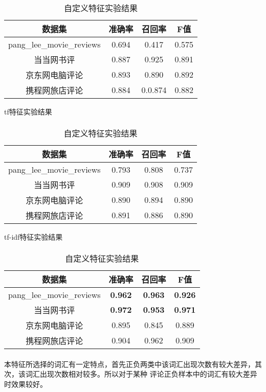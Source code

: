 \documentclass[a4paper,12pt]{article}
\begin{document}
\begin{CJK}{UTF8}{gbsn}
\begin{CJK}{UTF8}{gbsn}
\begin{table}
\paragraph{}
\begin{tabular}{|c|c|c|c|}
\hline
数据集 & 准确率 & 召回率 & F值\\
\hline
pang\_lee\_movie\_reviews & 0.694 & 0.417 & 0.575\\
当当网书评 & 0.887 & 0.925 & 0.891\\
京东网电脑评论 & 0.893 & 0.890 & 0.892\\
携程网旅店评论 & 0.884 & 0.0.874 & 0.882\\
\hline
\end{tabular}
\caption{tf特征实验结果}
\label{table:1}

\paragraph{}
\begin{tabular}{|c|c|c|c|}
\hline
数据集 & 准确率 & 召回率 & F值\\
\hline
pang\_lee\_movie\_reviews & 0.793 & 0.808 & 0.737\\
当当网书评 & 0.909 & 0.908 & 0.909\\
京东网电脑评论 & 0.890 & 0.894 & 0.890\\
携程网旅店评论 & 0.891 & 0.886 & 0.890\\
\hline
\end{tabular}
\caption{tf-idf特征实验结果}
\label{table:2}

\paragraph{}
\begin{tabular}{|c|c|c|c|}
\hline
数据集 & 准确率 & 召回率 & F值\\
\hline
pang\_lee\_movie\_reviews & \textbf{0.962} & \textbf{0.963} & \textbf{0.926}\\
当当网书评 & \textbf{0.972} & \textbf{0.953} & \textbf{0.971}\\
京东网电脑评论 & 0.895 & 0.845 & 0.889\\
携程网旅店评论 & 0.904 & 0.962 & 0.909\\
\hline
\end{tabular}
\caption{自定义特征实验结果}
\label{table:3}
\end{table}
\paragraph{}
本特征所选择的词汇有一定特点，首先正负两类中该词汇出现次数有较大差异，其次，该词汇出现次数相对较多。所以对于某种
评论正负样本中的词汇有较大差异时效果较好。

\end{CJK}
\end{CJK}
\end{document}
